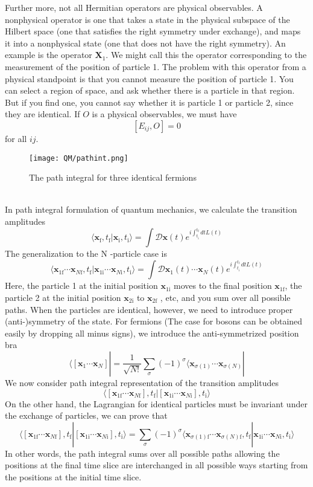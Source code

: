 Further more, not all Hermitian operators are physical observables. A nonphysical operator is one that takes a state
in the physical subspace of the Hilbert space (one that satisfies the right symmetry under exchange), and maps it into a nonphysical state (one that does not have the right symmetry).
An example is the operator $\bm{X}_1$. We might call this the operator corresponding to the measurement of the position of
particle 1. 
The problem with this operator from a physical standpoint is that you cannot measure the position of particle 1. You can select a region of space, and ask whether there is a particle in that region. But if you find one, you cannot say whether it is particle 1 or particle 2, since they are identical. 
If $O$ is a physical observables, we must have
\[[E_{ij},O] = 0\]
for all $ij$.
\begin{figure}[!h]
	\centering
	\texttt{[image: QM/pathint.png]}
	\caption{The path integral for three identical fermions}
\end{figure}\\
In path integral formulation of quantum mechanics, we calculate the transition amplitudes
\[\langle \bm{x}_{\mathrm{f}},t_{\mathrm{f}} | \bm{x}_{\mathrm{i}},t_{\mathrm{i}}\rangle = \int \mathcal{D}\bm{x}(t) e^{i\int_{t_{\mathrm{i}}}^{t_{\mathrm{f}}} dt L(t)}\]
The generalization to the N -particle case is
\[\langle \bm{x}_{1\mathrm{f}}\cdots\bm{x}_{N\mathrm{f}},t_{\mathrm{f}} | \bm{x}_{1\mathrm{i}}\cdots\bm{x}_{N\mathrm{i}},t_{\mathrm{i}}\rangle = \int \mathcal{D}\bm{x}_1(t)\cdots\bm{x}_N(t) e^{i\int_{t_{\mathrm{i}}}^{t_{\mathrm{f}}} dt L(t)}\]
Here, the particle 1 at the initial position $\bm{x}_{1\mathrm{i}}$ moves to the final position $\bm{x}_{1\mathrm{f}}$, the particle 2 at the initial position $\bm{x}_{2\mathrm{i}}$ to $\bm{x}_{2\mathrm{f}}$ , etc, and you sum over all possible paths.
When the particles are identical, however, we need to introduce proper (anti-)symmetry of the state. For fermions (The case for bosons can be obtained easily by dropping all minus signs), we introduce the anti-symmetrized position bra
\[\langle [\bm{x}_1\cdots\bm{x}_N]| = \frac{1}{\sqrt{N!}} \sum_{\sigma} (-1)^{\sigma} \langle \bm{x}_{\sigma(1)}\cdots\bm{x}_{\sigma(N)}|\]
We now consider path integral representation of the transition amplitudes
\[\langle [\bm{x}_{1\mathrm{f}}\cdots\bm{x}_{N\mathrm{f}}],t_{\mathrm{f}} | [\bm{x}_{1\mathrm{i}}\cdots\bm{x}_{N\mathrm{i}}],t_{\mathrm{i}}\rangle\]
On the other hand, the Lagrangian for identical particles must be invariant under the exchange of particles, we can prove that
\[\langle [\bm{x}_{1\mathrm{f}}\cdots\bm{x}_{N\mathrm{f}}],t_{\mathrm{f}} | [\bm{x}_{1\mathrm{i}}\cdots\bm{x}_{N\mathrm{i}}],t_{\mathrm{i}}\rangle = \sum_{\sigma} (-1)^{\sigma}  \langle \bm{x}_{\sigma(1)\mathrm{f}}\cdots\bm{x}_{\sigma(N)\mathrm{f}},t_{\mathrm{f}} | \bm{x}_{1\mathrm{i}}\cdots\bm{x}_{N\mathrm{i}},t_{\mathrm{i}}\rangle\]
In other words, the path integral sums over all possible paths allowing the positions at the final time slice are interchanged in all possible ways starting from the positions at the initial time slice.

